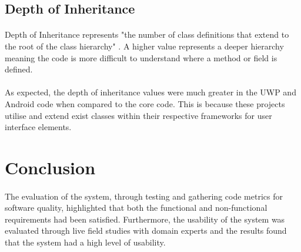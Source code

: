 {	\subsection*{Depth of Inheritance}{
		\paragraph{}{
		Depth of Inheritance represents "the number of class definitions that extend to the root of the class hierarchy" \cite{CodeMetrics}. A higher value represents a deeper hierarchy meaning the code is more difficult to understand where a method or field is defined.
		}
		\paragraph{}{
		As expected, the depth of inheritance values were much greater in the UWP and Android code when compared to the core code. This is because these projects utilise and extend exist classes within their respective frameworks for user interface elements.
		}
		

\section{Conclusion}
	\paragraph{}{
	The evaluation of the system, through testing and gathering code metrics for software quality, highlighted that both the functional and non-functional requirements had been satisfied. Furthermore, the usability of the system was evaluated through live field studies with domain experts and the results found that the system had a high level of usability.
	}		
	\paragraph{}{
	}
		
		\begin{table}[ht]
		\begin{scriptsize}			
			\begin{center}				
				\begin{tabularx}{\textwidth}{| l | X | l | l | l | l | l |}
								

\end{tabularx}
\end{center}
\end{scriptsize}
\end{table}}}
